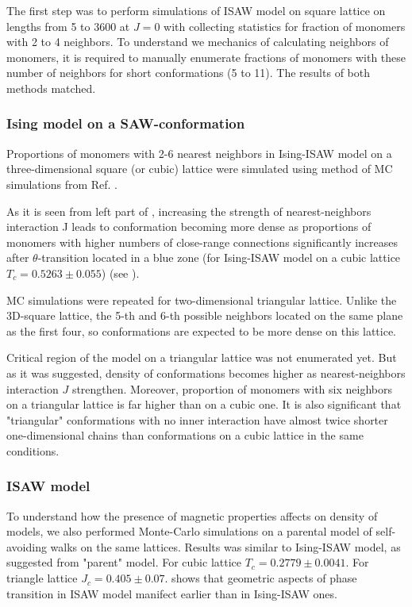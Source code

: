 The first step was to perform simulations of ISAW model on square lattice on lengths from 5 to 3600 at $J=0$ with collecting statistics for fraction of monomers with 2 to 4 neighbors. 
To understand we mechanics of calculating neighbors of monomers, it is required to manually enumerate fractions of monomers with these number of neighbors for short conformations (5 to 11). 
The results of both methods matched.


\subsubsection{Ising model on a SAW-conformation}

Proportions of monomers with 2-6 nearest neighbors in Ising-ISAW model on a three-dimensional square (or cubic) lattice were simulated using method of MC simulations from Ref. \cite{faizullina2021critical}.

As it is seen from left part of , increasing the strength of nearest-neighbors interaction J leads to conformation becoming more dense as proportions of monomers with higher numbers of close-range connections significantly increases after $\theta$-transition located in a blue zone (for Ising-ISAW model on a cubic lattice $T_{c} = 0.5263 \pm 0.055$\cite{Foster2021}) (see ).

MC simulations were repeated for two-dimensional triangular lattice. 
Unlike the 3D-square lattice, the 5-th and 6-th possible neighbors located on the same plane as the first four, so conformations are expected to be more dense on this lattice.

Critical region of the model on a triangular lattice was not enumerated yet. But as it was suggested, density of conformations becomes higher as nearest-neighbors interaction $J$ strengthen. Moreover, proportion of monomers with six neighbors on a triangular lattice is far higher than on a cubic one. It is also significant that "triangular" conformations with no inner interaction have almost twice shorter one-dimensional chains than conformations on a cubic lattice in the same conditions.

\subsubsection{ISAW model}

To understand how the presence of magnetic properties affects on density of models, we also performed Monte-Carlo simulations on a parental model of self-avoiding walks on the same lattices. Results was similar to Ising-ISAW model, as suggested from "parent" model. For cubic lattice $T_{c} = 0.2779\pm 0.0041 $\cite{Tesi1996}. For triangle lattice $J_{c} = 0.405 \pm 0.07 $\cite{Privman1986}.  shows that geometric aspects of phase transition in ISAW model manifect earlier than in Ising-ISAW ones.  



